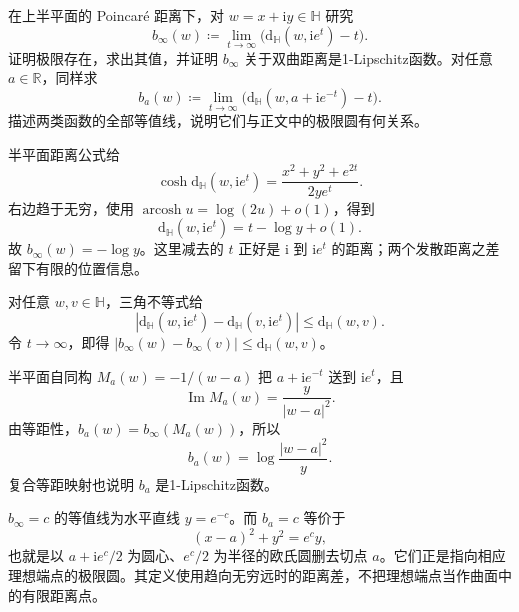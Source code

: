\begin{exercise}[理想端点的极限距离]\label{b3:ex:13-5}
在上半平面的 Poincaré 距离下，对 \(w=x+\mathrm i y\in\mathbb H\) 研究
\[
 b_\infty(w)\coloneqq
 \lim_{t\rightarrow\infty}\bigl(\mathrm d_{\mathbb H}(w,\mathrm i e^t)-t\bigr).
\]
证明极限存在，求出其值，并证明 \(b_\infty\) 关于双曲距离是1-Lipschitz函数。对任意 \(a\in\mathbb R\)，同样求
\[
 b_a(w)\coloneqq
 \lim_{t\rightarrow\infty}\bigl(\mathrm d_{\mathbb H}(w,a+\mathrm i e^{-t})-t\bigr).
\]
描述两类函数的全部等值线，说明它们与正文中的极限圆有何关系。
\end{exercise}
\begin{solution}
半平面距离公式给
\[
 \cosh\mathrm d_{\mathbb H}(w,\mathrm i e^t)
 =\frac{x^2+y^2+e^{2t}}{2ye^t}.
\]
右边趋于无穷，使用 \(\operatorname{arcosh}u=\log(2u)+o(1)\)，得到
\[
 \mathrm d_{\mathbb H}(w,\mathrm i e^t)
 =t-\log y+o(1).
\]
故 \(b_\infty(w)=-\log y\)。这里减去的 \(t\) 正好是 \(\mathrm i\) 到 \(\mathrm i e^t\) 的距离；两个发散距离之差留下有限的位置信息。

对任意 \(w,v\in\mathbb H\)，三角不等式给
\[
 \left|\mathrm d_{\mathbb H}(w,\mathrm i e^t)
       -\mathrm d_{\mathbb H}(v,\mathrm i e^t)\right|
 \le\mathrm d_{\mathbb H}(w,v).
\]
令 \(t\rightarrow\infty\)，即得
\( |b_\infty(w)-b_\infty(v)|\le\mathrm d_{\mathbb H}(w,v) \)。

半平面自同构 \(M_a(w)=-1/(w-a)\) 把 \(a+\mathrm i e^{-t}\) 送到 \(\mathrm i e^t\)，且
\[
 \operatorname{Im}M_a(w)=\frac{y}{|w-a|^2}.
\]
由等距性，\(b_a(w)=b_\infty(M_a(w))\)，所以
\[
 b_a(w)=\log\frac{|w-a|^2}{y}.
\]
复合等距映射也说明 \(b_a\) 是1-Lipschitz函数。

\(b_\infty=c\) 的等值线为水平直线 \(y=e^{-c}\)。而 \(b_a=c\) 等价于
\[
 (x-a)^2+y^2=e^c y,
\]
也就是以 \(a+\mathrm i e^c/2\) 为圆心、\(e^c/2\) 为半径的欧氏圆删去切点 \(a\)。它们正是指向相应理想端点的极限圆。其定义使用趋向无穷远时的距离差，不把理想端点当作曲面中的有限距离点。
\end{solution}

